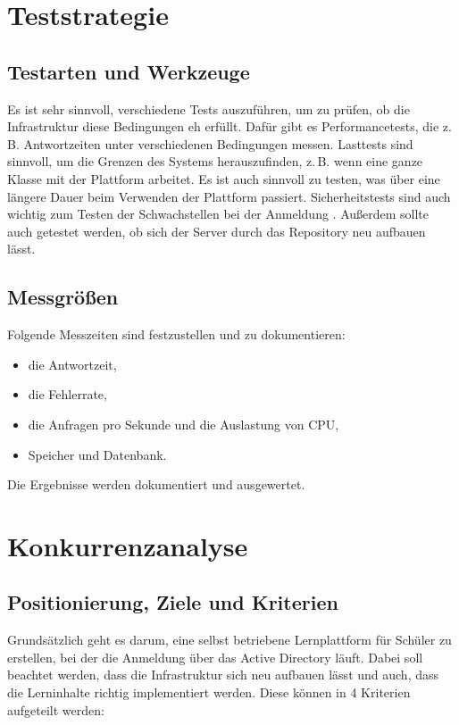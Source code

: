 \section{Teststrategie}
 
\subsection{Testarten und Werkzeuge}
 
Es ist sehr sinnvoll, verschiedene Tests auszuführen, um zu prüfen, ob die Infrastruktur diese Bedingungen eh erfüllt. Dafür gibt es Performancetests, die z.\,B. Antwortzeiten unter verschiedenen Bedingungen messen. Lasttests sind sinnvoll, um die Grenzen des Systems herauszufinden, z.\,B. wenn eine ganze Klasse mit der Plattform arbeitet. Es ist auch sinnvoll zu testen, was über eine längere Dauer beim Verwenden der Plattform passiert. Sicherheitstests sind auch wichtig zum Testen der Schwachstellen bei der Anmeldung \parencite[Kap.~17]{beyer2016sre}. Außerdem sollte auch getestet werden, ob sich der Server durch das Repository neu aufbauen lässt.
 
\subsection{Messgrößen}
 
Folgende Messzeiten sind festzustellen und zu dokumentieren:
 
\begin{itemize}
  \item die Antwortzeit,
  \item die Fehlerrate,
  \item die Anfragen pro Sekunde und die Auslastung von CPU,
  \item Speicher und Datenbank.
\end{itemize}
 
Die Ergebnisse werden dokumentiert und ausgewertet.
 
\section{Konkurrenzanalyse}
 
\subsection{Positionierung, Ziele und Kriterien}
 
Grundsätzlich geht es darum, eine selbst betriebene Lernplattform für Schüler zu erstellen, bei der die Anmeldung über das Active Directory läuft. Dabei soll beachtet werden, dass die Infrastruktur sich neu aufbauen lässt und auch, dass die Lerninhalte richtig implementiert werden. Diese können in 4 Kriterien aufgeteilt werden:
 
